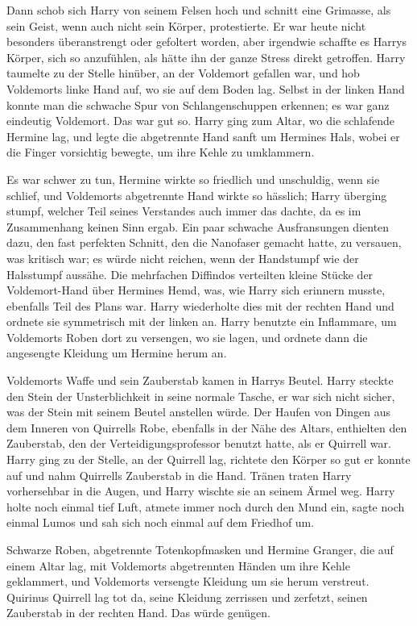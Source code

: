 Dann schob sich Harry von seinem Felsen hoch und schnitt eine Grimasse, als sein
Geist, wenn auch nicht sein Körper, protestierte. Er war heute nicht besonders
überanstrengt oder gefoltert worden, aber irgendwie schaffte es Harrys Körper,
sich so anzufühlen, als hätte ihn der ganze Stress direkt getroffen. Harry
taumelte zu der Stelle hinüber, an der Voldemort gefallen war, und hob
Voldemorts linke Hand auf, wo sie auf dem Boden lag. Selbst in der linken Hand
konnte man die schwache Spur von Schlangenschuppen erkennen; es war ganz
eindeutig Voldemort. Das war gut so. Harry ging zum Altar, wo die schlafende
Hermine lag, und legte die abgetrennte Hand sanft um Hermines Hals, wobei er die
Finger vorsichtig bewegte, um ihre Kehle zu umklammern.

Es war schwer zu tun, Hermine wirkte so friedlich und unschuldig, wenn sie
schlief, und Voldemorts abgetrennte Hand wirkte so hässlich; Harry überging
stumpf, welcher Teil seines Verstandes auch immer das dachte, da es im
Zusammenhang keinen Sinn ergab. Ein paar schwache Ausfransungen dienten dazu,
den fast perfekten Schnitt, den die Nanofaser gemacht hatte, zu versauen, was
kritisch war; es würde nicht reichen, wenn der Handstumpf wie der Halsstumpf
aussähe. Die mehrfachen Diffindos verteilten kleine Stücke der Voldemort-Hand
über Hermines Hemd, was, wie Harry sich erinnern musste, ebenfalls Teil des
Plans war. Harry wiederholte dies mit der rechten Hand und ordnete sie
symmetrisch mit der linken an. Harry benutzte ein Inflammare, um Voldemorts
Roben dort zu versengen, wo sie lagen, und ordnete dann die angesengte Kleidung
um Hermine herum an.

Voldemorts Waffe und sein Zauberstab kamen in Harrys Beutel. Harry steckte den
Stein der Unsterblichkeit in seine normale Tasche, er war sich nicht sicher, was
der Stein mit seinem Beutel anstellen würde. Der Haufen von Dingen aus dem
Inneren von Quirrells Robe, ebenfalls in der Nähe des Altars, enthielten den
Zauberstab, den der Verteidigungsprofessor benutzt hatte, als er Quirrell war.
Harry ging zu der Stelle, an der Quirrell lag, richtete den Körper so gut er
konnte auf und nahm Quirrells Zauberstab in die Hand. Tränen traten Harry
vorhersehbar in die Augen, und Harry wischte sie an seinem Ärmel weg. Harry
holte noch einmal tief Luft, atmete immer noch durch den Mund ein, sagte noch
einmal \glqq Lumos\grqq{} und sah sich noch einmal auf dem Friedhof um.

Schwarze Roben, abgetrennte Totenkopfmasken und Hermine Granger, die auf einem
Altar lag, mit Voldemorts abgetrennten Händen um ihre Kehle geklammert, und
Voldemorts versengte Kleidung um sie herum verstreut. Quirinus Quirrell lag tot
da, seine Kleidung zerrissen und zerfetzt, seinen Zauberstab in der rechten
Hand. Das würde genügen.

